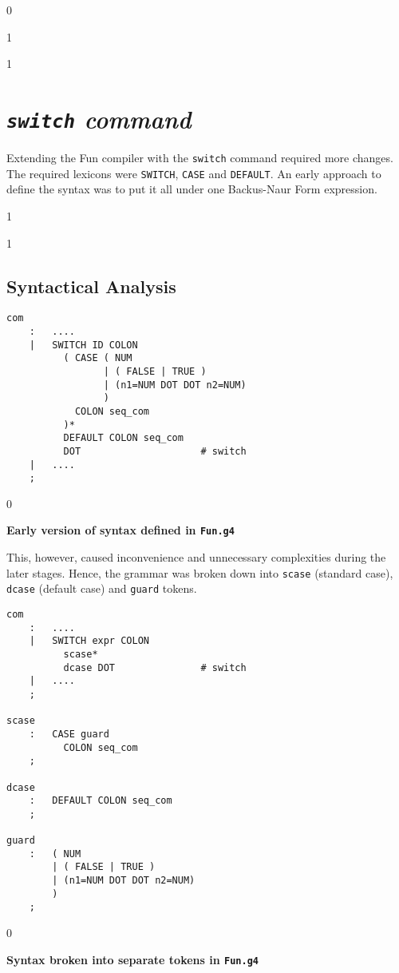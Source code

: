 \documentclass{article}
\newcommand{\code}[1]{\texttt{#1}}
\newenvironment{codelst}{\captionsetup{type=listing}}{}
\newcommand{\showdetails}{1}
\newcommand{\dividestages}{0}
\newcommand{\showobjectcode}{0}
\newcommand{\npage}{
    \if\dividestages1
        \newpage
    \fi
}
\newcommand{\stage}[1]{
    \if\dividestages1
        \vspace{0.5cm}
        \subsection{#1}
    \fi
}
\newcommand{\codecaption}[1]{
    \if\dividestages0
        \vspace{-0.75cm}
        \caption{\textbf{#1}}
        \vspace{0.4cm}
    \fi
}
\begin{document}
\fi




\if\showdetails0
\vspace{4cm}
\fi



\vspace{0.5cm}

\if\showobjectcode1
\npage
\fi

\section{\textit{\code{switch} command}}

\noindent Extending the Fun compiler with the \code{switch} command required more changes. The required lexicons were \code{SWITCH}, \code{CASE} and \code{DEFAULT}. An early approach to define the syntax was to put it all under one Backus-Naur Form expression.

\if\showdetails1


\stage{Syntactical Analysis}

\begin{codelst}
\begin{verbatim}
com
    :   ....
    |   SWITCH ID COLON
          ( CASE ( NUM
                 | ( FALSE | TRUE )
                 | (n1=NUM DOT DOT n2=NUM)
                 )
            COLON seq_com
          )*
          DEFAULT COLON seq_com
          DOT					  # switch
    |   ....
    ;
\end{verbatim}
\codecaption{Early version of syntax defined in \code{Fun.g4}}
\end{codelst}

\vspace{0.2cm}

\noindent This, however, caused inconvenience and unnecessary complexities during the later stages. Hence, the grammar was broken down into \code{scase} (standard case), \code{dcase} (default case) and \code{guard} tokens.


\begin{codelst}
\begin{verbatim}
com
    :   ....
    |   SWITCH expr COLON
          scase*
          dcase DOT			      # switch
    |   ....
    ;

scase
    :   CASE guard
          COLON seq_com
    ;

dcase
    :   DEFAULT COLON seq_com
    ;

guard
    :   ( NUM
        | ( FALSE | TRUE )
        | (n1=NUM DOT DOT n2=NUM)
        )
    ;
\end{verbatim}
\codecaption{Syntax broken into separate tokens in \code{Fun.g4}}
\end{codelst}
\end{document}
